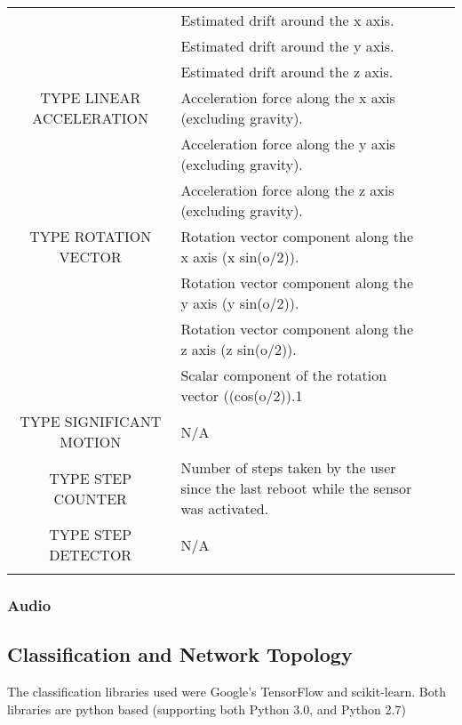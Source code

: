 \documentclass{UoNMCHA}
\numberwithin{equation}{section}
\begin{document}
\begin{table}[h!]
\begin{center}
{\begin{tabular}{c l l l|}
                  & Estimated drift around the x axis. \\
                  & Estimated drift around the y axis. \\
                  & Estimated drift around the z axis. \\
                TYPE LINEAR ACCELERATION & Acceleration force along the x axis (excluding gravity). \\
                  & Acceleration force along the y axis (excluding gravity). \\
                  & Acceleration force along the z axis (excluding gravity). \\
                TYPE ROTATION VECTOR & Rotation vector component along the x axis (x  sin(o/2)). \\
                  & Rotation vector component along the y axis (y  sin(o/2)). \\
                  & Rotation vector component along the z axis (z  sin(o/2)). \\
                  & Scalar component of the rotation vector ((cos(o/2)).1 \\
                TYPE SIGNIFICANT MOTION & N/A \\
                TYPE STEP COUNTER & Number of steps taken by the user since the last reboot while the sensor was activated. \\
                TYPE STEP DETECTOR & N/A \\
                \\ \hline
            \end{tabular}
        }
    \end{center}
\end{table}

\subsubsection{Audio}

\subsection{Classification and Network Topology}
The classification libraries used were Google's TensorFlow and scikit-learn. Both libraries are python based (supporting both Python 3.0, and Python 2.7) \cite{scikitlearnpythonVer} \cite{TFpythonVer}%
\end{document}
